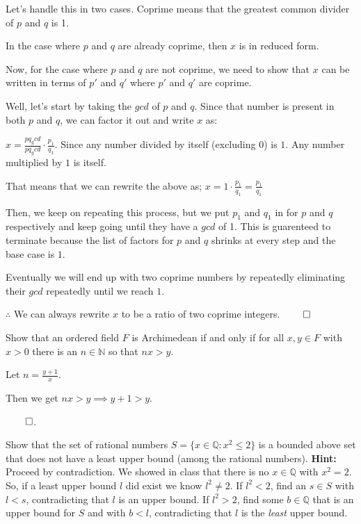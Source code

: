 \documentclass[answers]{exam}
\theoremstyle{remark}
\theoremstyle{definition}
\newcommand{\NN}{\mathbb{N}}
\newcommand{\QQ}{\mathbb{Q}}
\begin{document}
\begin{questions}
\begin{solution}
Let's handle this in two cases. Coprime means that the
greatest common divider of $p$ and $q$ is 1.

In the case where $p$ and $q$ are already coprime, then $x$ is in reduced form.

Now, for the case where $p$ and $q$ are not coprime, we need to show that
$x$ can be written in terms of $p'$ and $q'$ where
$p'$ and $q'$ are coprime.

Well, let's start by taking the $gcd$ of $p$ and $q$.
Since that number is present in both $p$ and $q$,
we can factor it out and write $x$ as:

$x = \frac{pq_gcd}{pq_gcd} \cdot \frac{p_1}{q_1}$.
Since any number divided by itself (excluding $0$) is $1$.
Any number multiplied by $1$ is itself.

That means that we can rewrite the above as;
$x = 1 \cdot \frac{p_1}{q_1} = \frac{p_1}{q_1}$

Then, we keep on repeating this process, but we put $p_1$ and $q_1$ in for $p$ and $q$
respectively and keep going until they have a $gcd$ of 1.
This is guarenteed to terminate because the list of factors for $p$ and $q$ shrinks at
every step and the base case is $1$.

Eventually we will end up with two coprime numbers by repeatedly eliminating
their $gcd$ repeatedly until we reach $1$.

$\therefore$ We can always rewrite $x$ to be a ratio of two coprime integers. $\qed$


\end{solution}

\question Show that an ordered field $F$ is Archimedean if and only if for all $x,y \in F$ with $x >0$ there is an $n \in \NN$ so that $nx>y$.
\begin{solution}

Let $n = \frac{y+1}{x}$.

Then we get
$nx > y \implies y+1 > y$.

$\qed$.

\end{solution}

\question Show that the set of rational numbers $S=\{ x \in \QQ: x^2  \le 2 \}$ is a bounded above set that does not have a least upper bound (among the rational numbers). \textbf{Hint:} Proceed by contradiction. We showed in class that there is no $x \in \QQ$ with $x^2=2$. So, if a least upper bound $l$ did exist we know $l^2 \not=2$. If $l^2<2$, find an $s \in S$ with $l<s$, contradicting that $l$ is an upper bound. If $l^2>2$, find some $b \in \QQ$ that is an upper bound for $S$ and with $b<l$, contradicting that $l$ is the \emph{least} upper bound.


\end{questions}
\end{document}

